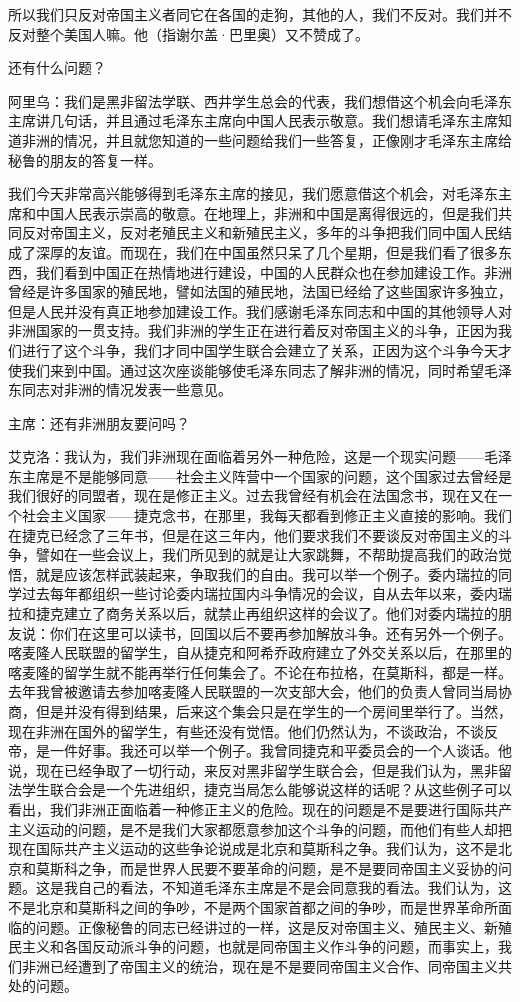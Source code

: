 所以我们只反对帝国主义者同它在各国的走狗，其他的人，我们不反对。我们并不反对整个美国人嘛。他（指谢尔盖·巴里奥）又不赞成了。

还有什么问题？

阿里乌：我们是黑非留法学联、西井学生总会的代表，我们想借这个机会向毛泽东主席讲几句话，并且通过毛泽东主席向中国人民表示敬意。我们想请毛泽东主席知道非洲的情况，并且就您知道的一些问题给我们一些答复，正像刚才毛泽东主席给秘鲁的朋友的答复一样。

我们今天非常高兴能够得到毛泽东主席的接见，我们愿意借这个机会，对毛泽东主席和中国人民表示崇高的敬意。在地理上，非洲和中国是离得很远的，但是我们共同反对帝国主义，反对老殖民主义和新殖民主义，多年的斗争把我们同中国人民结成了深厚的友谊。而现在，我们在中国虽然只呆了几个星期，但是我们看了很多东西，我们看到中国正在热情地进行建设，中国的人民群众也在参加建设工作。非洲曾经是许多国家的殖民地，譬如法国的殖民地，法国已经给了这些国家许多独立，但是人民并没有真正地参加建设工作。我们感谢毛泽东同志和中国的其他领导人对非洲国家的一贯支持。我们非洲的学生正在进行着反对帝国主义的斗争，正因为我们进行了这个斗争，我们才同中国学生联合会建立了关系，正因为这个斗争今天才使我们来到中国。通过这次座谈能够使毛泽东同志了解非洲的情况，同时希望毛泽东同志对非洲的情况发表一些意见。

主席：还有非洲朋友要问吗？

艾克洛：我认为，我们非洲现在面临着另外一种危险，这是一个现实问题——毛泽东主席是不是能够同意——社会主义阵营中一个国家的问题，这个国家过去曾经是我们很好的同盟者，现在是修正主义。过去我曾经有机会在法国念书，现在又在一个社会主义国家——捷克念书，在那里，我每天都看到修正主义直接的影响。我们在捷克已经念了三年书，但是在这三年内，他们要求我们不要谈反对帝国主义的斗争，譬如在一些会议上，我们所见到的就是让大家跳舞，不帮助提高我们的政治觉悟，就是应该怎样武装起来，争取我们的自由。我可以举一个例子。委内瑞拉的同学过去每年都组织一些讨论委内瑞拉国内斗争情况的会议，自从去年以来，委内瑞拉和捷克建立了商务关系以后，就禁止再组织这样的会议了。他们对委内瑞拉的朋友说：你们在这里可以读书，回国以后不要再参加解放斗争。还有另外一个例子。喀麦隆人民联盟的留学生，自从捷克和阿希乔政府建立了外交关系以后，在那里的喀麦隆的留学生就不能再举行任何集会了。不论在布拉格，在莫斯科，都是一样。去年我曾被邀请去参加喀麦隆人民联盟的一次支部大会，他们的负责人曾同当局协商，但是并没有得到结果，后来这个集会只是在学生的一个房间里举行了。当然，现在非洲在国外的留学生，有些还没有觉悟。他们仍然认为，不谈政治，不谈反帝，是一件好事。我还可以举一个例子。我曾同捷克和平委员会的一个人谈话。他说，现在已经争取了一切行动，来反对黑非留学生联合会，但是我们认为，黑非留法学生联合会是一个先进组织，捷克当局怎么能够说这样的话呢？从这些例子可以看出，我们非洲正面临着一种修正主义的危险。现在的问题是不是要进行国际共产主义运动的问题，是不是我们大家都愿意参加这个斗争的问题，而他们有些人却把现在国际共产主义运动的这些争论说成是北京和莫斯科之争。我们认为，这不是北京和莫斯科之争，而是世界人民要不要革命的问题，是不是要同帝国主义妥协的问题。这是我自己的看法，不知道毛泽东主席是不是会同意我的看法。我们认为，这不是北京和莫斯科之间的争吵，不是两个国家首都之间的争吵，而是世界革命所面临的问题。正像秘鲁的同志已经讲过的一样，这是反对帝国主义、殖民主义、新殖民主义和各国反动派斗争的问题，也就是同帝国主义作斗争的问题，而事实上，我们非洲已经遭到了帝国主义的统治，现在是不是要同帝国主义合作、同帝国主义共处的问题。

